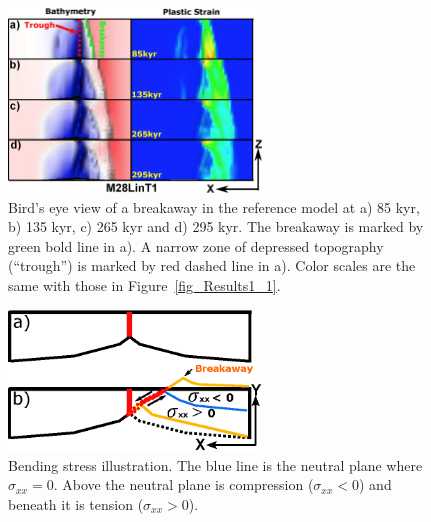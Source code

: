 \begin{figure}[h]
  \centering
    \includegraphics[width=0.6\textwidth]{./Figures/fig_Results1_4.eps}
  \caption{Bird's eye view of a breakaway in the reference model at a) 85 kyr, b) 135 kyr, c) 265 kyr and d) 295 kyr. The breakaway is marked by green bold line in a). A narrow zone of depressed topography (``trough'') is marked by red dashed line in a). Color scales are the same with those in Figure~\hyperref[fig_Results1_1]{\ref{fig_Results1_1}}.}
 \label{fig_Results1_4}
\end{figure}

\begin{figure}[h]
  \centering
    \includegraphics[width=0.6\textwidth]{./Figures/fig_Results4_8_sqrt_cut_back_bending_cartoon.eps}
  \caption{Bending stress illustration. The blue line is the neutral plane where $\sigma_{xx}=0$. Above the neutral plane is compression ($\sigma_{xx}<0$) and beneath it is tension ($\sigma_{xx}>0$).}
 \label{fig_Results4_8}
\end{figure}

